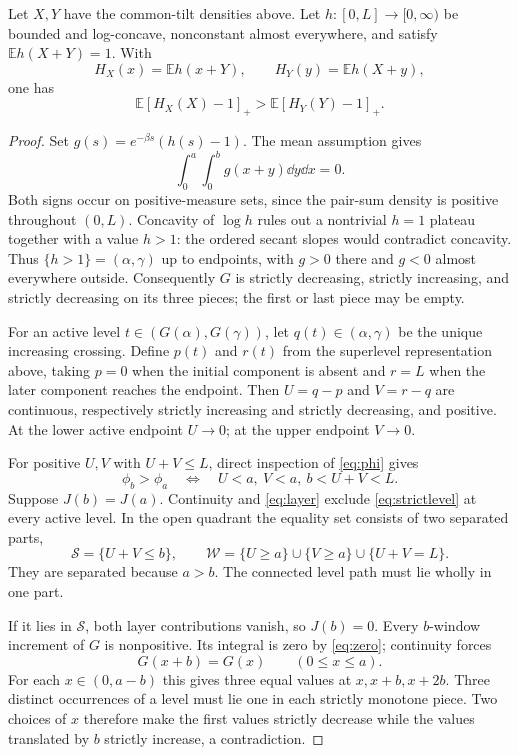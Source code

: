 \documentclass[11pt,a4paper]{article}
\theoremstyle{remark}\newtheorem*{ednote}{Editorial note (ProveIt, 2026-10-01)}
\newcommand{\E}{\mathbb E}\newcommand{\R}{\mathbb R}
\begin{document}
\begin{lemma}\label{lem:strict}
Let $X,Y$ have the common-tilt densities above. Let $h:[0,L]\to[0,\infty)$ be bounded and log-concave, nonconstant almost everywhere, and satisfy $\E h(X+Y)=1$. With
\[
 H_X(x)=\E h(x+Y),\qquad H_Y(y)=\E h(X+y),
\]
one has
\begin{equation}\label{eq:stoploss}
 \E[H_X(X)-1]_+>\E[H_Y(Y)-1]_+.
\end{equation}
\end{lemma}
\begin{proof}
Set $g(s)=e^{-\beta s}(h(s)-1)$. The mean assumption gives
\begin{equation}\label{eq:zero}
 \int_0^a\int_0^b g(x+y)\dd y\dd x=0.
\end{equation}
Both signs occur on positive-measure sets, since the pair-sum density is positive throughout $(0,L)$. Concavity of $\log h$ rules out a nontrivial $h=1$ plateau together with a value $h>1$: the ordered secant slopes would contradict concavity. Thus $\{h>1\}=(\alpha,\gamma)$ up to endpoints, with $g>0$ there and $g<0$ almost everywhere outside. Consequently $G$ is strictly decreasing, strictly increasing, and strictly decreasing on its three pieces; the first or last piece may be empty.

For an active level $t\in(G(\alpha),G(\gamma))$, let $q(t)\in(\alpha,\gamma)$ be the unique increasing crossing. Define $p(t)$ and $r(t)$ from the superlevel representation above, taking $p=0$ when the initial component is absent and $r=L$ when the later component reaches the endpoint. Then $U=q-p$ and $V=r-q$ are continuous, respectively strictly increasing and strictly decreasing, and positive. At the lower active endpoint $U\to0$; at the upper endpoint $V\to0$.

For positive $U,V$ with $U+V\le L$, direct inspection of \eqref{eq:phi} gives
\begin{equation}\label{eq:strictlevel}
 \phi_b>\phi_a
 \quad\Longleftrightarrow\quad
 U<a,\ V<a,\ b<U+V<L.
\end{equation}
Suppose $J(b)=J(a)$. Continuity and \eqref{eq:layer} exclude \eqref{eq:strictlevel} at every active level. In the open quadrant the equality set consists of two separated parts,
\[
 \mathcal S=\{U+V\le b\},\qquad
 \mathcal W=\{U\ge a\}\cup\{V\ge a\}\cup\{U+V=L\}.
\]
They are separated because $a>b$. The connected level path must lie wholly in one part.

If it lies in $\mathcal S$, both layer contributions vanish, so $J(b)=0$. Every $b$-window increment of $G$ is nonpositive. Its integral is zero by \eqref{eq:zero}; continuity forces
\[
 G(x+b)=G(x)\qquad(0\le x\le a).
\]
For each $x\in(0,a-b)$ this gives three equal values at $x,x+b,x+2b$. Three distinct occurrences of a level must lie one in each strictly monotone piece. Two choices of $x$ therefore make the first values strictly decrease while the values translated by $b$ strictly increase, a contradiction.


\end{proof}
\end{document}
